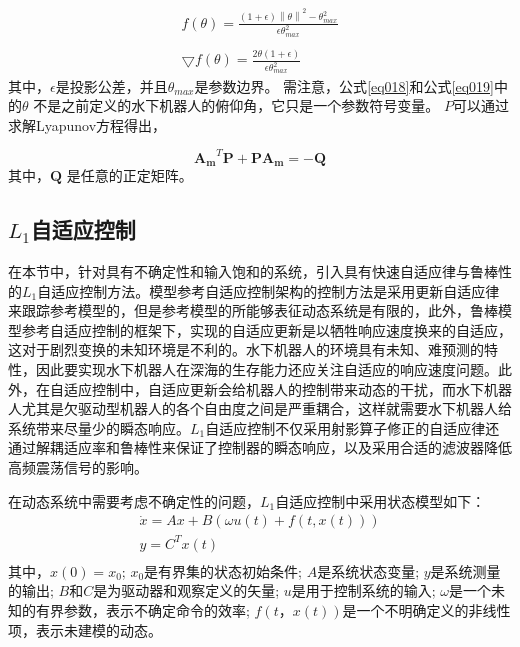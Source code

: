 \begin{equation}
\label{eq019}
\begin{array}{l}
f(\theta)={}\frac{\left ( 1+ \epsilon  \right )\left \| \theta  \right \|^2 - \theta _{max}^2}{\epsilon \theta_{max}^2}\\
\\
\bigtriangledown f(\theta)={}\frac{2 \theta(1+\epsilon )}{\epsilon \theta _{max}^2}
\end{array}
\end{equation}
其中，$\epsilon$是投影公差，并且$\theta_{max}$是参数边界。 需注意，公式\ref {eq018}和公式\ref {eq019}中的$\theta$ 不是之前定义的水下机器人的俯仰角，它只是一个参数符号变量。 $P$可以通过求解Lyapunov方程得出，

\begin{equation}
\bm{A_m}^T \bm{P} + \bm{P} \bm{A_m} = -\bm{Q}
\end{equation}
其中，$\bm{Q}$ 是任意的正定矩阵。


\subsection{$L_{1}$自适应控制 }


在本节中，针对具有不确定性和输入饱和的系统，引入具有快速自适应律与鲁棒性的$L_1$自适应控制方法。模型参考自适应控制架构的控制方法是采用更新自适应律来跟踪参考模型的，但是参考模型的所能够表征动态系统是有限的，此外，鲁棒模型参考自适应控制的框架下，实现的自适应更新是以牺牲响应速度换来的自适应，这对于剧烈变换的未知环境是不利的。水下机器人的环境具有未知、难预测的特性，因此要实现水下机器人在深海的生存能力还应关注自适应的响应速度问题。此外，在自适应控制中，自适应更新会给机器人的控制带来动态的干扰，而水下机器人尤其是欠驱动型机器人的各个自由度之间是严重耦合，这样就需要水下机器人给系统带来尽量少的瞬态响应。$L_1$自适应控制不仅采用射影算子修正的自适应律还通过解耦适应率和鲁棒性来保证了控制器的瞬态响应，以及采用合适的滤波器降低高频震荡信号的影响\cite{maalouf2013contribution}。

在动态系统中需要考虑不确定性的问题，$L_1$自适应控制中采用状态模型如下：
\begin{equation}
\begin{array}{l}
 \dot x = Ax + B(\omega u(t) + f(t,x(t))) \\
 y = {C^T}x(t) \\
 \end{array}
\end{equation}
其中，$x(0)= x_0$; $ x_0 $是有界集的状态初始条件; $ A $是系统状态变量; $y$是系统测量的输出; $B$和$C$是为驱动器和观察定义的矢量; $u$是用于控制系统的输入; $\omega$是一个未知的有界参数，表示不确定命令的效率; $f(t，x(t))$是一个不明确定义的非线性项，表示未建模的动态。

